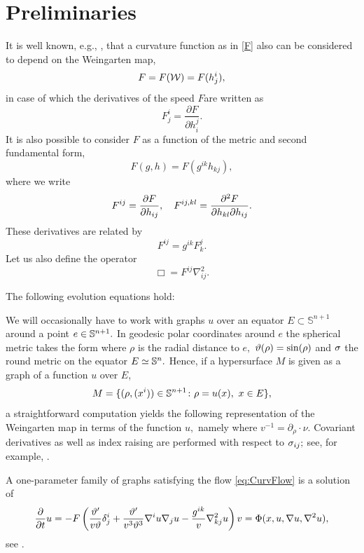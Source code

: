 \documentclass{amsart}
\begin{document}
\section{Preliminaries}\label{prelim}
\label{sec:prelim}
It is well known, e.g., \cite[Chapter 2]{Gerhardt:/2006}, that a curvature function as in \cref{F} also can be considered to depend on the Weingarten map,
\[F=F(\mc{W})=F(h^i_j),\]
in case of which the derivatives of the speed \(F\)are written as
\[
F^{i}_{j} = \frac{\partial F}{\partial h^{j}_{i}}.
\]
It is also possible to consider $F$ as a function of the metric and second fundamental form,
\[
F(g, h) = F(g^{ik} h_{kj}),
\]
where we write
\[
F^{ij} = \frac{\partial F}{\partial h_{ij}}, \quad F^{ij,kl} = \fr{\partial^2F}{\partial h_{kl} \partial h_{ij}}.
\]
These derivatives are related by
\[F^{ij}=g^{ik}F^j_k.\]
Let us also define the operator
\[
\Box = F^{ij} \nabla^2_{ij}.
\]
\begin{lemma} \label{lem: basi ev}
The following evolution equations hold:
\end{lemma}

We will occasionally have to work with graphs \(u\) over an equator $E \subset \mathbb{S}^{n+1}$ around a point $e\in\S^{n+1}.$ In geodesic polar coordinates around $e$ the spherical metric takes the form
where $\rho$ is the radial distance to $e,$ $\vt(\rho)=\sin(\rho)$ and $\s$ the round metric on the equator $E\simeq \S^n.$ Hence, if a hypersurface $M$ is given as a graph of a function $u$ over $E$,
\[M=\{(\rho,(x^i))\in \S^{n+1}\cn \rho=u(x),~ x\in E\},\]
a straightforward computation yields the following representation of the Weingarten map in terms of the function $u,$ namely
where $v^{-1} = \partial_\rho \cdot \nu.$ Covariant derivatives as well as index raising are performed with respect to $\s_{ij};$ see, for example, \cite[(3.82)]{Scheuer:05/2015}.

A one-parameter family of graphs satisfying the flow \eqref{eq:CurvFlow} is a solution of
\begin{equation}
\label{eq:GraphCurvFlow}
\fr{\del}{\del t}u=-F\br{\fr{\vt'}{v\vt}\d^{i}_{j}+\fr{\vt'}{v^{3}\vt^{3}}\nabla^{i}u\nabla_{j}u-\fr{g^{ik}}{v}\nabla^{2}_{kj}u}v=\Phi(x,u,\nabla u,\nabla^{2}u),
\end{equation}
see \cite[p.~98-99]{Gerhardt:/2006}.
\end{document}
